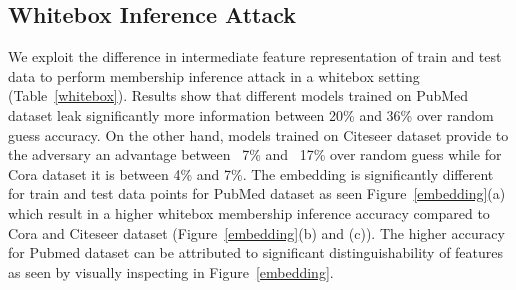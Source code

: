 \subsection{Whitebox Inference Attack}

We exploit the difference in intermediate feature representation of train and test data to perform membership inference attack in a whitebox setting (Table~\ref{whitebox}).
Results show that different models trained on PubMed dataset leak significantly more information between 20\% and 36\% over random guess accuracy.
On the other hand, models trained on Citeseer dataset provide to the adversary an advantage between ~7\% and ~17\% over random guess while for Cora dataset it is between 4\% and 7\%.
The embedding is significantly different for train and test data points for PubMed dataset as seen Figure~\ref{embedding}(a) which result in a higher whitebox membership inference accuracy compared to Cora and Citeseer dataset (Figure~\ref{embedding}(b) and (c)).
The higher accuracy for Pubmed dataset can be attributed to significant distinguishability of features as seen by visually inspecting in Figure~\ref{embedding}.


